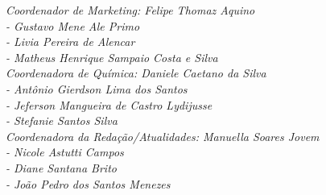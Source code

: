{\noindent
\textit{Coordenador de Marketing: Felipe Thomaz Aquino}\\
\textit{- Gustavo Mene Ale Primo}\\
\textit{- Livia Pereira de Alencar}\\
\textit{- Matheus Henrique Sampaio Costa e Silva}\\

\noindent
\textit{Coordenadora de Química: Daniele Caetano da Silva}\\
\textit{- Antônio Gierdson Lima dos Santos}\\
\textit{- Jeferson Mangueira de Castro Lydijusse}\\
\textit{- Stefanie Santos Silva}\\

\noindent
\textit{Coordenadora da Redação/Atualidades: Manuella Soares Jovem}\\
\textit{- Nicole Astutti Campos}\\
\textit{- Diane Santana Brito}\\
\textit{- João Pedro dos Santos Menezes}\\



\setlength{\parskip}{0mm}
}
